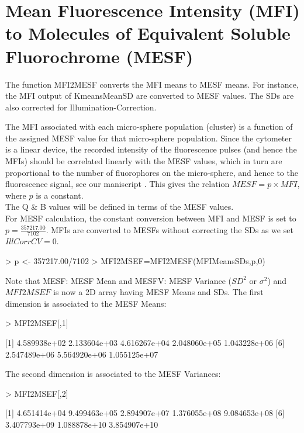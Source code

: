 \documentclass{article}
\begin{document}
\section{Mean Fluorescence Intensity (MFI) to Molecules of Equivalent Soluble Fluorochrome (MESF)}\label{mesf}

The function MFI2MESF converts the MFI means to MESF means. For instance, the MFI output of KmeansMeanSD are converted to MESF values. The SDs are also corrected for Illumination-Correction.

The MFI associated with each micro-sphere population (cluster) is a function of the assigned MESF value for that micro-sphere population. Since the cytometer is a linear device, the recorded intensity of the fluorescence pulses (and hence the MFIs) should be correlated linearly with the MESF values, which in turn are proportional to the number of fluorophores on the micro-sphere, and hence to the fluorescence signal, see our maniscript \cite{f}. This gives the relation $MESF = p \times MFI$, where $p$ is a constant. \\

The Q \& B values will be defined in terms of the MESF values. \\

For MESF calculation, the constant conversion between MFI and MESF is set to $p=\frac{357217.00}{7102}$.
MFIs are converted to MESFs without correcting the SDs as we set $IllCorrCV=0$.

\begin{Schunk}
\begin{Sinput}
> p <- 357217.00/7102
> MFI2MSEF=MFI2MESF(MFIMeansSDs,p,0)
\end{Sinput}
\end{Schunk}


Note that MESF: MESF Mean and MESFV: MESF Variance ($SD^{2}$ or $\sigma^{2}$) and $MFI2MSEF$ is now a 2D array having MESF Means and SDs.
The first dimension is associated to the MESF Means:

\begin{Schunk}
\begin{Sinput}
> MFI2MSEF[,1]
\end{Sinput}
[1] 4.589938e+02 2.133604e+03 4.616267e+04 2.048060e+05 1.043228e+06
[6] 2.547489e+06 5.564920e+06 1.055125e+07\end{Schunk}

The second dimension is associated to the MESF Variances:
\begin{Schunk}
\begin{Sinput}
> MFI2MSEF[,2]
\end{Sinput}
[1] 4.651414e+04 9.499463e+05 2.894907e+07 1.376055e+08 9.084653e+08
[6] 3.407793e+09 1.088878e+10 3.854907e+10\end{Schunk}
\end{document}
